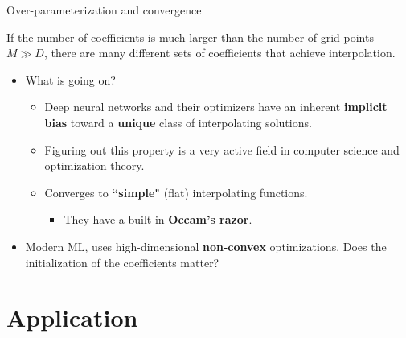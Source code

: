 \documentclass[aspectratio=169,10pt]{beamer}
\newcommand{\emphcolor}[1]{\textbf{\textcolor{emphcolorval}{#1}}}
\begin{document}
\begin{frame}{Over-parameterization and convergence}

		If the number of coefficients is much larger than the number of grid points $M\gg D$, there are many different sets of coefficients that achieve interpolation.
		\begin{itemize}
		\item What is going on?  \vspace{0.1in}
		\begin{itemize}
			\item Deep neural networks and their optimizers have an inherent \emphcolor{implicit bias} toward a  \emphcolor{unique} class of interpolating solutions.\vspace{0.1in}
			\item Figuring out this property is a very active field in computer science and optimization theory.\vspace{0.1in}
			\item Converges to \emphcolor{``simple"} (flat) interpolating functions. \vspace{0.1in}
			\begin{itemize}
				\item They have a built-in \emphcolor{Occam's razor}.\vspace{0.1in}
			\end{itemize}
		\end{itemize}
	\item Modern ML, uses high-dimensional \emphcolor{non-convex} optimizations. Does the initialization of the coefficients matter? 
	\end{itemize}		 

\end{frame}	


		\section{Application}
		
\end{document}
